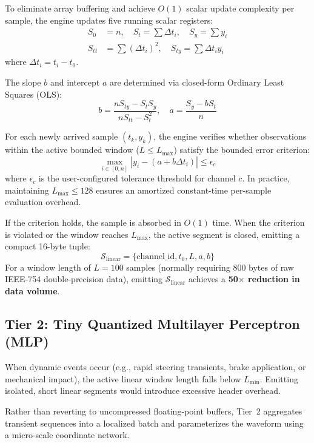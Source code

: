 \documentclass[journal]{IEEEtran}
\begin{document}
To eliminate array buffering and achieve $O(1)$ scalar update complexity per sample, the engine updates five running scalar registers:
\begin{align}
S_0 &= n, \quad S_t = \sum \Delta t_i, \quad S_y = \sum y_i \nonumber \\
S_{tt} &= \sum (\Delta t_i)^2, \quad S_{ty} = \sum \Delta t_i y_i
\end{align}
where $\Delta t_i = t_i - t_0$.

The slope $b$ and intercept $a$ are determined via closed-form Ordinary Least Squares (OLS):
\begin{equation}
b = \frac{n S_{ty} - S_t S_y}{n S_{tt} - S_t^2}, \quad a = \frac{S_y - b S_t}{n}
\end{equation}

For each newly arrived sample $(t_k, y_k)$, the engine verifies whether observations within the active bounded window ($L \le L_{\max}$) satisfy the bounded error criterion:
\begin{equation}
\max_{i \in [0, n]} |y_i - (a + b \Delta t_i)| \le \epsilon_c
\end{equation}
where $\epsilon_c$ is the user-configured tolerance threshold for channel $c$. In practice, maintaining $L_{\max} \le 128$ ensures an amortized constant-time per-sample evaluation overhead.

If the criterion holds, the sample is absorbed in $O(1)$ time. When the criterion is violated or the window reaches $L_{\max}$, the active segment is closed, emitting a compact 16-byte tuple:
\begin{equation}
\mathcal{S}_{\text{linear}} = \{ \text{channel\_id}, t_0, L, a, b \}
\end{equation}
For a window length of $L = 100$ samples (normally requiring 800 bytes of raw IEEE-754 double-precision data), emitting $\mathcal{S}_{\text{linear}}$ achieves a \textbf{50$\times$ reduction in data volume}.

\subsection{Tier 2: Tiny Quantized Multilayer Perceptron (MLP)}
When dynamic events occur (e.g., rapid steering transients, brake application, or mechanical impact), the active linear window length falls below $L_{\min}$. Emitting isolated, short linear segments would introduce excessive header overhead. 

Rather than reverting to uncompressed floating-point buffers, Tier~2 aggregates transient sequences into a localized batch and parameterizes the waveform using a micro-scale coordinate network.
\end{document}
